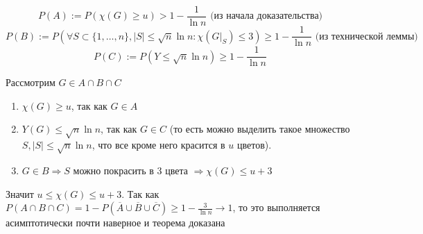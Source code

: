 $$P(A):=P(\chi(G) \geq u) > 1-\frac{1}{\ln{n}} \text{ (из начала доказательства)}$$
$$P(B):=P(\forall S \subset \{1, \ldots, n\}, |S|\leq \sqrt{n}\ln{n}: \chi(G|_S) \leq 3) \geq 1-\frac{1}{\ln{n}} \text{ (из технической леммы)}$$
$$P(C):=P(Y \leq \sqrt{n} \ln{n}) \geq 1 - \frac{1}{\ln{n}}$$

\par Рассмотрим $G \in A \cap B \cap C$
\begin{enumerate}
    \item $\chi(G) \geq u$, так как $G \in A$
    \item $Y(G) \leq \sqrt{n} \ln{n}$, так как $G \in C$ (то есть можно выделить такое множество $S, |S| \leq \sqrt{n}\ln{n}$, что все кроме него красится в $u$ цветов). 
    \item $G \in B \Rightarrow S$ можно покрасить в 3 цвета $\Rightarrow \chi(G) \leq u+3$    
\end{enumerate}

\par Значит $u \leq \chi(G) \leq u+3$. Так как $P(A \cap B \cap C) = 1 - P(\overline{A} \cup \overline{B} \cup \overline{C}) \geq 1 - \frac{3}{\ln{n}}\rightarrow 1$, то это выполняется асимптотически почти наверное и теорема доказана \EndProof